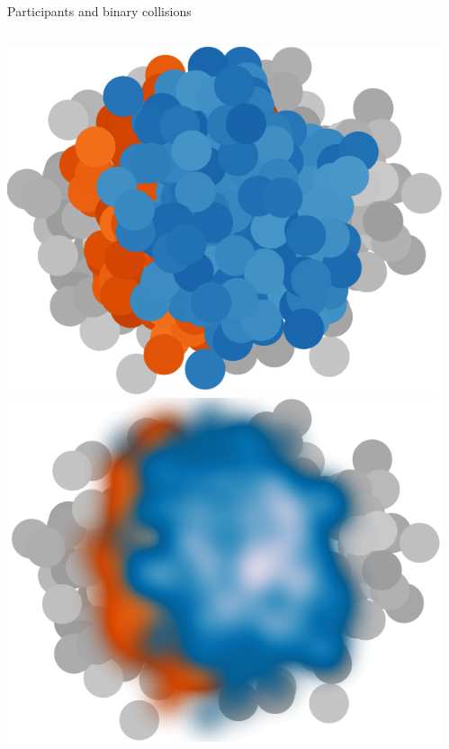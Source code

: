 \documentclass[11pt, aspectratio=169]{beamer}
\begin{document}
\begin{frame}{Participants and binary collisions}
\begin{columns}
\begin{column}{.3\textwidth}
\begin{overprint}
\includegraphics[width=\textwidth]{Participants.png}
\includegraphics[width=\textwidth]{Npart-density.png}
\end{overprint}
\end{column}
\begin{column}{.7\textwidth}
\begin{itemize}

\end{itemize}
\end{column}
\end{columns}
\end{frame}
\end{document}
